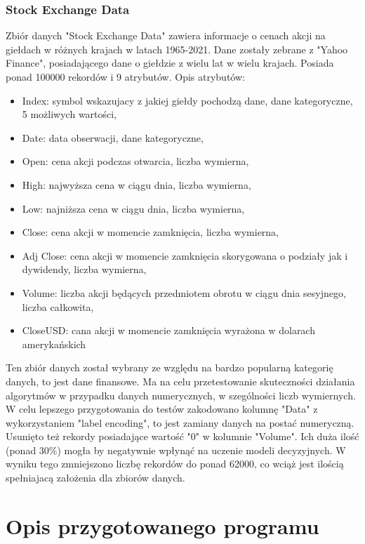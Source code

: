 \documentclass[12pt,twoside]{article}
\begin{document}
\subsubsection{Stock Exchange Data}

Zbiór danych "Stock Exchange Data" zawiera informacje o cenach akcji na giełdach w różnych krajach w latach 1965-2021.
Dane zostały zebrane z "Yahoo Finance", posiadającego dane o giełdzie z wielu lat w wielu krajach.
Posiada ponad 100000 rekordów i 9 atrybutów. \cite{stock} Opis atrybutów:
\begin{itemize}[label=-,labelsep=0.4cm, leftmargin=1.25cm]
    \item Index: symbol wskazujacy z jakiej giełdy pochodzą dane, dane kategoryczne, 5 możliwych wartości,
    \item Date: data obserwacji, dane kategoryczne,
    \item Open: cena akcji podczas otwarcia, liczba wymierna,
    \item High: najwyższa cena w ciągu dnia, liczba wymierna,
    \item Low: najniższa cena w ciągu dnia, liczba wymierna,
    \item Close: cena akcji w momencie zamknięcia, liczba wymierna,
    \item Adj Close: cena akcji w momencie zamknięcia skorygowana o podziały jak i dywidendy, liczba wymierna,
    \item Volume: liczba akcji będących przedmiotem obrotu w ciągu dnia sesyjnego, liczba całkowita,
    \item CloseUSD: cana akcji w momencie zamknięcia wyrażona w dolarach amerykańskich
\end{itemize}
Ten zbiór danych został wybrany ze względu na bardzo popularną kategorię danych, to jest dane finansowe.
Ma na celu przetestowanie skuteczności działania algorytmów w przypadku danych numerycznych,
w szególności liczb wymiernych.
W celu lepszego przygotowania do testów zakodowano kolumnę "Data" z wykorzystaniem "label encoding",
to jest zamiany danych na postać numeryczną.
Usunięto też rekordy posiadające wartość "0" w kolumnie "Volume".
Ich duża ilość (ponad 30\%) mogła by negatywnie wpłynąć na uczenie modeli decyzyjnych.
W wyniku tego zmniejszono liczbę rekordów do ponad 62000,
co wciąż jest ilością spełniajacą założenia dla zbiorów danych.


\clearpage
\section{Opis przygotowanego programu}
\end{document}
